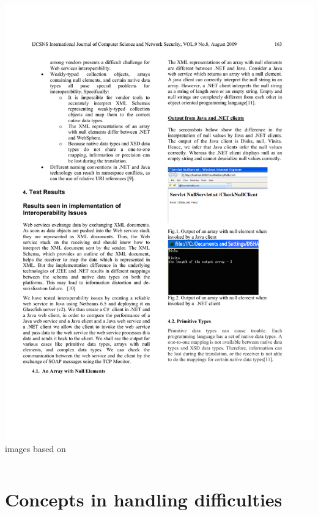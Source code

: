 \documentclass{beamer}
\begin{document}
\begin{frame}
\begin{columns}
\begin{column}{0.5\textwidth}
  \includegraphics[scale=0.8]{graphics/NETNull.pdf}
  \\ \tiny{images based on \cite{Shetty:2009}}
  \end{column}
  \end{columns}
\end{frame}



\section[Concepts]{Concepts in handling difficulties}
\end{document}

